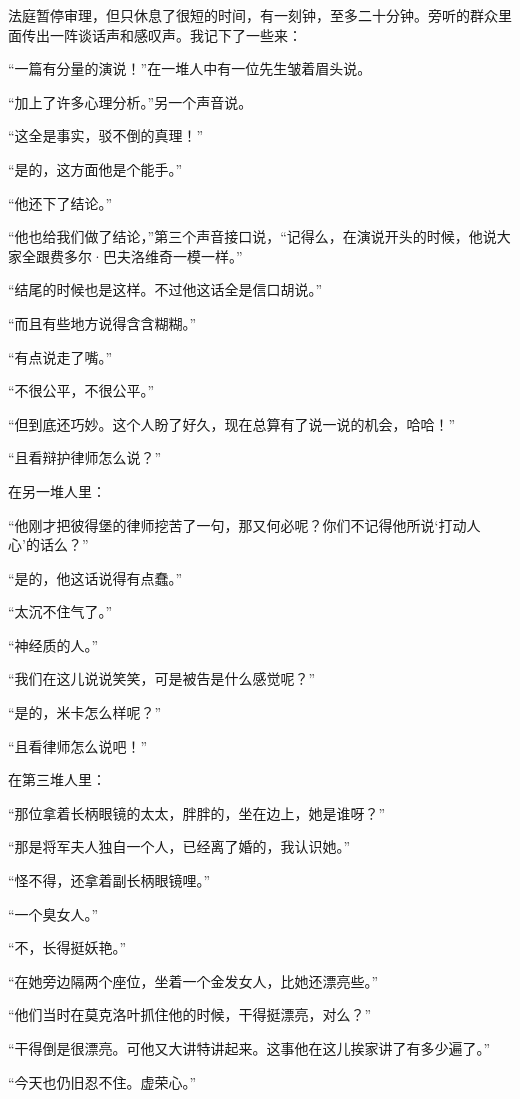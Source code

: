 \par 法庭暂停审理，但只休息了很短的时间，有一刻钟，至多二十分钟。旁听的群众里面传出一阵谈话声和感叹声。我记下了一些来：
\par “一篇有分量的演说！”在一堆人中有一位先生皱着眉头说。
\par “加上了许多心理分析。”另一个声音说。
\par “这全是事实，驳不倒的真理！”
\par “是的，这方面他是个能手。”
\par “他还下了结论。”
\par “他也给我们做了结论，”第三个声音接口说，“记得么，在演说开头的时候，他说大家全跟费多尔·巴夫洛维奇一模一样。”
\par “结尾的时候也是这样。不过他这话全是信口胡说。”
\par “而且有些地方说得含含糊糊。”
\par “有点说走了嘴。”
\par “不很公平，不很公平。”
\par “但到底还巧妙。这个人盼了好久，现在总算有了说一说的机会，哈哈！”
\par “且看辩护律师怎么说？”
\par 在另一堆人里：
\par “他刚才把彼得堡的律师挖苦了一句，那又何必呢？你们不记得他所说‘打动人心’的话么？”
\par “是的，他这话说得有点蠢。”
\par “太沉不住气了。”
\par “神经质的人。”
\par “我们在这儿说说笑笑，可是被告是什么感觉呢？”
\par “是的，米卡怎么样呢？”
\par “且看律师怎么说吧！”
\par 在第三堆人里：
\par “那位拿着长柄眼镜的太太，胖胖的，坐在边上，她是谁呀？”
\par “那是将军夫人独自一个人，已经离了婚的，我认识她。”
\par “怪不得，还拿着副长柄眼镜哩。”
\par “一个臭女人。”
\par “不，长得挺妖艳。”
\par “在她旁边隔两个座位，坐着一个金发女人，比她还漂亮些。”
\par “他们当时在莫克洛叶抓住他的时候，干得挺漂亮，对么？”
\par “干得倒是很漂亮。可他又大讲特讲起来。这事他在这儿挨家讲了有多少遍了。”
\par “今天也仍旧忍不住。虚荣心。”
